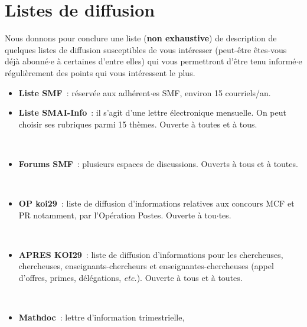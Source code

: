 
\chapter{Listes de diffusion}


Nous donnons  pour conclure une liste (\textbf{non exhaustive}) de description de quelques listes de diffusion susceptibles de vous int\'eresser (peut-\^etre \^etes-vous
d\'ej\`a abonn\'e$\cdot$e \`a certaines d'entre elles) qui vous permettront d'\^etre
tenu inform\'e$\cdot$e r\'eguli\`erement des points qui vous int\'eressent le plus. \\

\begin{itemize}
\item
{\bf Liste SMF}~: r\'eserv\'ee aux adh\'erent$\cdot$es SMF, environ 15 courriels/an.
\\
\item {\bf Liste SMAI-Info}~: il s'agit d'une lettre \'electronique
mensuelle. On peut choisir ses rubriques parmi 15 th\`emes. Ouverte
\`a toutes et \`a tous.

\\
\item {\bf Forums SMF}~: plusieurs espaces de discussions. Ouverts \`a tous et \`a toutes.

\\
\item {\bf OP koi29}~: liste de diffusion d'informations relatives
aux concours MCF et PR notamment, par l'Op\'eration Postes. Ouverte \`a
tou$\cdot$tes.

\\
\item{\bf APRES KOI29}~:
liste de diffusion d'informations pour les chercheuses, chercheuses,
enseignants-chercheurs et enseignantes-chercheuses (appel d'offres, primes, d\'el\'egations,
{\em etc.}). Ouverte \`a tous et \`a toutes.

\\
\item {\bf Mathdoc}~: lettre d'information trimestrielle,


\end{itemize}
